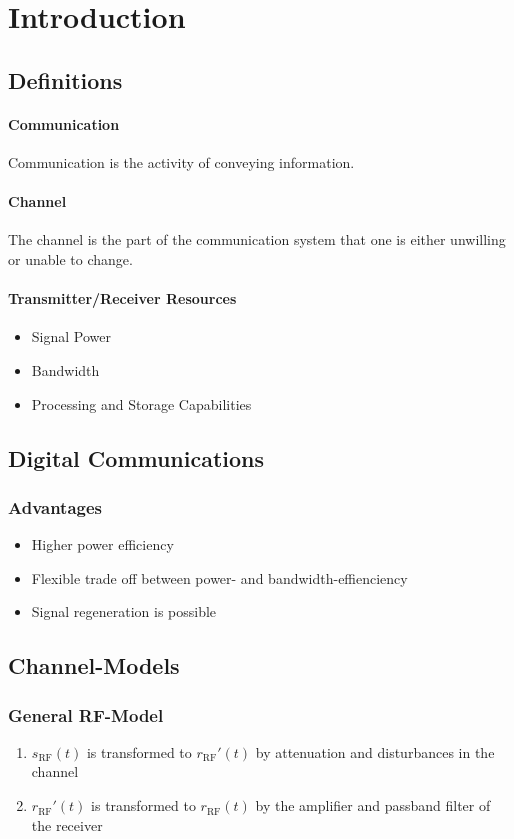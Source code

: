 \chapter{Introduction}
\section{Definitions}
\subsubsection{Communication}
Communication is the activity of conveying information.

\subsubsection{Channel}
The channel is the part of the communication system
that one is either unwilling or unable to change.

\subsubsection{Transmitter/Receiver Resources}
\begin{itemize}
    \item Signal Power
    \item Bandwidth
    \item Processing and Storage Capabilities
\end{itemize}

\section{Digital Communications}
\subsection{Advantages}
\begin{itemize}
    \item Higher power efficiency
    \item Flexible trade off between power- and bandwidth-effienciency
    \item Signal regeneration is possible
\end{itemize}

\section{Channel-Models}
\subsection{General RF-Model}
\begin{enumerate}
    \item $s_\text{RF}(t)$ is transformed to $r_\text{RF}'(t)$ by attenuation and
        disturbances in the channel
    \item $r_\text{RF}'(t)$ is transformed to $r_\text{RF}(t)$ by the amplifier
        and passband filter of the receiver
\end{enumerate}

